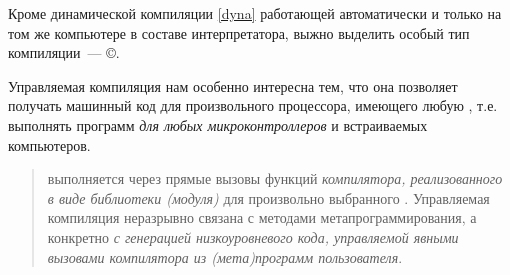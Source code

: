 \label{managed}

Кроме динамической компиляции \ref{dyna} работающей автоматически и только на
том же компьютере в составе интерпретатора, выжно выделить особый тип
компиляции\ ---  \copyright. 

Управляемая компиляция нам особенно интересна тем, что она позволяет получать
машинный код для произвольного процессора,
имеющего любую , т.е. выполнять
 программ \emph{для любых микроконтроллеров} и
встраиваемых компьютеров.

\begin{quotation}\noindent
{} выполняется через прямые вызовы функций
\emph{компилятора, реализованного в виде библиотеки (модуля)} для произвольно
выбранного . Управляемая
компиляция неразрывно связана с методами метапрограммирования, а конкретно
\textit{с генерацией низкоуровневого кода, управляемой явными вызовами
компилятора из (мета)программ пользователя}.
\end{quotation}